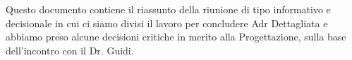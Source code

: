 Questo documento contiene il riassunto della riunione di tipo informativo e decisionale in cui ci siamo divisi il lavoro per concludere Adr Dettagliata e abbiamo preso alcune decisioni critiche in merito alla Progettazione, sulla base dell'incontro con il Dr. Guidi.

